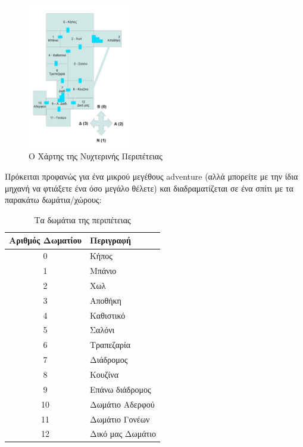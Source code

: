 \begin{figure}[H]
  \centering
  \includegraphics[width=0.4\textwidth]{images/chapter2/adventure-map}
  \caption{Ο Χάρτης της Νυχτερινής Περιπέτειας}
  \label{2-3}
\end{figure}

Πρόκειται προφανώς για ένα μικρού μεγέθους adventure (αλλά μπορείτε με την
ίδια μηχανή να φτιάξετε ένα  όσο μεγάλο θέλετε) και διαδραματίζεται σε ένα
σπίτι με τα παρακάτω δωμάτια/χώρους:

\begin{table}[H]
\begin{center}
\begin{tabular}{|c|l|}
\hline
  \textbf{Αριθμός Δωματίου} & \textbf{Περιγραφή} \\
\hline
0 & Κήπος \\
\hline
1 & Μπάνιο \\
\hline
2 & Χωλ \\
\hline
3 & Αποθήκη \\
\hline
4 & Καθιστικό \\
\hline
5 & Σαλόνι \\
\hline
6 & Τραπεζαρία \\
\hline
7 & Διάδρομος \\
\hline
8 & Κουζίνα \\
\hline
9 & Επάνω διάδρομος \\
\hline
10 & Δωμάτιο Αδερφού \\
\hline
11 & Δωμάτιο Γονέων \\
\hline
12 & Δικό μας Δωμάτιο \\
\hline
\end{tabular}
\end{center}
\caption{Τα δωμάτια της περιπέτειας}
\label{t2-1}
\end{table}

